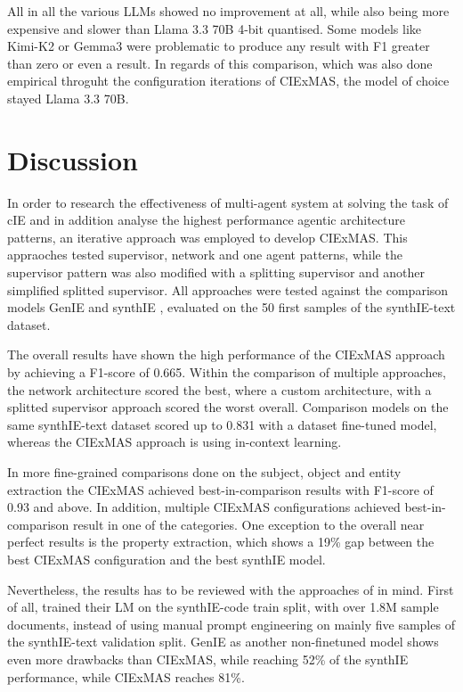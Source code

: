\documentclass[a4paper,oneside,bibliography=totoc]{scrbook}
\begin{document}
All in all the various \acp{LLM} showed no improvement at all, while also being more expensive and slower than Llama 3.3 70B 4-bit quantised. Some models like Kimi-K2 or Gemma3 were problematic to produce any result with F1 greater than zero or even a result. In regards of this comparison, which was also done empirical throguht the configuration iterations of CIExMAS, the model of choice stayed Llama 3.3 70B.

\section{Discussion}
\label{sec:discussion}

In order to research the effectiveness of multi-agent system at solving the task of \ac{cIE} and in addition analyse the highest performance agentic architecture patterns, an iterative approach was employed to develop CIExMAS. This appraoches tested supervisor, network and one agent patterns, while the supervisor pattern was also modified with a splitting supervisor and another simplified splitted supervisor. All approaches were tested against the comparison models GenIE and synthIE \cite{Josifoski2021,Josifoski2023}, evaluated on the 50 first samples of the synthIE-text dataset.

The overall results have shown the high performance of the CIExMAS approach by achieving a F1-score of 0.665. Within the comparison of multiple approaches, the network architecture scored the best, where a custom architecture, with a splitted supervisor approach scored the worst overall. Comparison models on the same synthIE-text dataset scored up to 0.831 with a dataset fine-tuned model, whereas the CIExMAS approach is using in-context learning.

In more fine-grained comparisons done on the subject, object and entity extraction the CIExMAS achieved best-in-comparison results with F1-score of 0.93 and above. In addition, multiple CIExMAS configurations achieved best-in-comparison result in one of the categories. One exception to the overall near perfect results is the property extraction, which shows a 19\% gap between the best CIExMAS configuration and the best synthIE model.

Nevertheless, the results has to be reviewed with the approaches of \citet{Josifoski2023,Josifoski2021} in mind. First of all, \citet{Josifoski2023} trained their \ac{LM} on the synthIE-code train split, with over 1.8M sample documents, instead of using manual prompt engineering on mainly five samples of the synthIE-text validation split. GenIE as another non-finetuned model shows even more drawbacks than CIExMAS, while reaching 52\% of the synthIE performance, while CIExMAS reaches 81\%.
\end{document}
